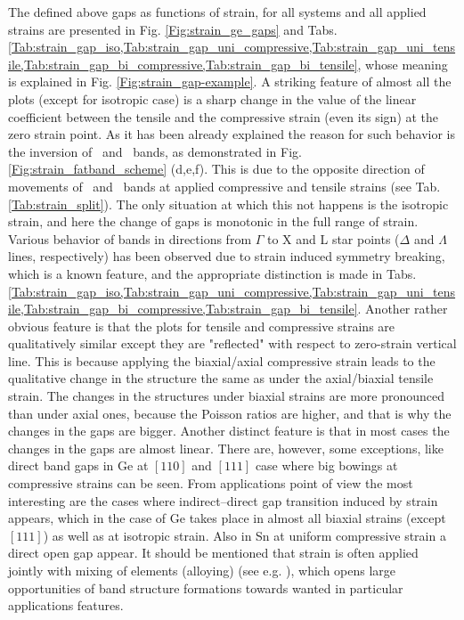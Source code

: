 The defined above gaps as functions of strain, for all systems and all applied strains are presented in Fig. \ref{Fig:strain_ge_gaps} and Tabs. \cref{Tab:strain_gap_iso,Tab:strain_gap_uni_compressive,Tab:strain_gap_uni_tensile,Tab:strain_gap_bi_compressive,Tab:strain_gap_bi_tensile}, whose meaning is explained in Fig. \ref{Fig:strain_gap-example}.
A striking feature of almost all the plots (except for isotropic case) is a sharp change in the value of the linear coefficient between the tensile and the compressive strain (even its sign) at the zero strain point.
As it has been already explained the reason for such behavior is the inversion of \HH\ and \LH\ bands, as demonstrated in Fig. \ref{Fig:strain_fatband_scheme} (d,e,f).
This is due to the opposite direction of movements of \HH\ and \LH\ bands at applied compressive and tensile strains (see Tab. \ref{Tab:strain_split}).
The only situation at which this not happens is the isotropic strain, and here the change of gaps is monotonic in the full range of strain.
Various behavior of bands in directions from $\Gamma$ to X and L star points ($\Delta$ and $\Lambda$ lines, respectively) has been observed due to strain induced symmetry breaking, which is a known feature, and the appropriate distinction is made in Tabs. \cref{Tab:strain_gap_iso,Tab:strain_gap_uni_compressive,Tab:strain_gap_uni_tensile,Tab:strain_gap_bi_compressive,Tab:strain_gap_bi_tensile}.
Another rather obvious feature is  that the plots for tensile and compressive strains are qualitatively similar except they are "reflected" with respect to zero-strain vertical line.
This is because applying the biaxial/axial compressive strain leads to the qualitative change in the structure the same as under the axial/biaxial tensile strain.
The changes in the structures under biaxial strains are more pronounced than under axial ones, because the Poisson ratios are higher, and that is why the changes in the gaps are bigger.
Another distinct feature is that in most cases the changes in the gaps are almost linear.
There are, however, some exceptions, like direct band gaps in Ge at $[110]$ and $[111]$ case where big bowings at compressive strains can be seen.
From applications point of view the most interesting are the cases where indirect--direct gap transition induced by strain appears, which in the case of Ge takes place in almost all biaxial strains (except $[111]$) as well as at isotropic strain.
Also in Sn at uniform compressive strain a direct open gap appear.
It should  be mentioned that strain is often applied jointly with mixing of elements (alloying) (see e.g. \cite{Polak.2017}), which opens large opportunities of band structure formations towards wanted in particular applications features.


